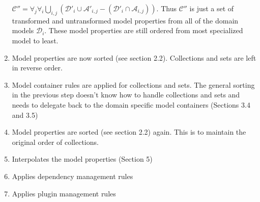 \documentclass[12pt]{amsart}
\begin{document}
\begin{enumerate}
\begin{math}
\mathcal{C''} =  \forall_j \forall_i \bigcup_{i,j}(\mathcal{D'}_{i} \cup \mathcal{A'}_{i,j} - (\mathcal{D'}_{i} \cap\mathcal{A}_{i,j})) \end{math}. Thus \begin{math}\mathcal{C''} \end{math} is just a set of transformed and untransformed model properties from all of the domain models \begin{math}
\mathcal{D}_{i} \end{math}. These model properties are still ordered from most specialized model to least.
\item Model properties are now sorted (see section 2.2). Collections and sets are left in reverse order.
\item Model container rules are applied for collections and sets. The general sorting in the previous step doesn't know how to handle collections and sets and needs to delegate back to the domain specific model containers (Sections 3.4 and 3.5)
\item Model properties are sorted (see section 2.2) again. This is to maintain the original order of collections.
\item Interpolates the model properties (Section 5)
\item Applies dependency management rules
\item Applies plugin management rules
\end{enumerate}
\end{document}
